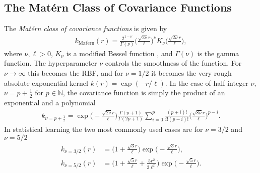 \documentclass[twoside,english]{uiofysmaster}
\begin{document}
{{%

\subsection{The Mat\'{e}rn Class of Covariance Functions}\label{Sec:: gaussian process : Matern Class of Covariance Functions}

The \textit{Mat\'{e}rn class of covariance functions} is given by
\begin{align}\label{Eq:: gaussian process : Matern class of covariance functions}
k_{\mathrm{Mat\acute{e}rn}} (r) = \frac{2^{1- \nu}}{\Gamma (\nu)} \Big( \frac{\sqrt{2 \nu} r	}{\ell} \Big)^{\nu} K_{\nu} \Big( \frac{\sqrt{2 \nu}r}{\ell} \Big),
\end{align}
where $\nu, \ell > 0$, $K_{\nu}$ is a modified Bessel function \cite{abramowitz1964handbook}, and $\Gamma(\nu)$ is the gamma function. The hyperparameter $\nu$ controls the smoothness of the function. For $\nu \rightarrow \infty$ this becomes the RBF, and for $\nu = 1/2$ it becomes the very rough absolute exponential kernel $k(r)= \exp (-r/\ell)$. In the case of half integer $\nu$, $\nu = p + \frac{1}{2}$ for $p \in \mathbb{N}$, the covariance function is simply the product of an exponential and a polynomial
\begin{align}
k_{\nu=p+\frac{1}{2}} = \exp \Big(- \frac{\sqrt{2 \nu} r	}{\ell} \Big) \frac{\Gamma(p+1)}{\Gamma(2p + 1)} \sum^p_{i=0} \frac{(p+i)!}{i!(p-i)!} \Big( \frac{\sqrt{8 \nu} r	}{\ell} \Big)^{p-i}.
\end{align}
In statistical learning the two most commonly used cases are for $\nu = 3/2$ and $\nu = 5/2$
\begin{align}
k_{\nu = 3/2}(r) &=  \Big(1 + \frac{\sqrt{3}r}{\ell} \Big) \exp \Big( -\frac{\sqrt{3}r}{\ell} \Big),\\
k_{\nu = 5/2}(r) &=  \Big(1 + \frac{\sqrt{5}r}{\ell}  + \frac{5r^2}{3 \ell^2}\Big) \exp \Big( -\frac{\sqrt{5}r}{\ell} \Big).
\end{align}



}}
\end{document}
